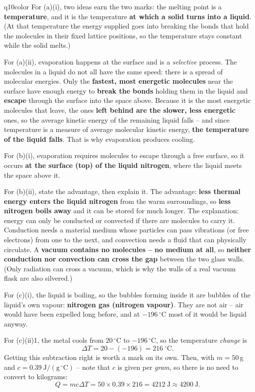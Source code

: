 \documentclass[11pt,a4paper]{article}
\begin{document}
\begin{ansbox}{q10color}
For (a)(i), two ideas earn the two marks: the melting point is a \textbf{temperature}, and it is the temperature \textbf{at which a solid turns into a liquid}. (At that temperature the energy supplied goes into breaking the bonds that hold the molecules in their fixed lattice positions, so the temperature stays constant while the solid melts.)

For (a)(ii), evaporation happens at the surface and is a \emph{selective} process. The molecules in a liquid do not all have the same speed: there is a spread of molecular energies. Only the \textbf{fastest, most energetic molecules} near the surface have enough energy to \textbf{break the bonds} holding them in the liquid and \textbf{escape} through the surface into the space above. Because it is the most energetic molecules that leave, the ones \textbf{left behind are the slower, less energetic} ones, so the average kinetic energy of the remaining liquid falls -- and since temperature is a measure of average molecular kinetic energy, \textbf{the temperature of the liquid falls}. That is why evaporation produces cooling.

For (b)(i), evaporation requires molecules to escape through a free surface, so it occurs \textbf{at the surface (top) of the liquid nitrogen}, where the liquid meets the space above it.

For (b)(ii), state the advantage, then explain it. The advantage: \textbf{less thermal energy enters the liquid nitrogen} from the warm surroundings, so \textbf{less nitrogen boils away} and it can be stored for much longer. The explanation: energy can only be conducted or convected if there are molecules to carry it. Conduction needs a material medium whose particles can pass vibrations (or free electrons) from one to the next, and convection needs a fluid that can physically circulate. A \textbf{vacuum contains no molecules -- no medium at all}, so \textbf{neither conduction nor convection can cross the gap} between the two glass walls. (Only radiation can cross a vacuum, which is why the walls of a real vacuum flask are also silvered.)

For (c)(i), the liquid is boiling, so the bubbles forming inside it are bubbles of the liquid's own vapour: \textbf{nitrogen gas (nitrogen vapour)}. They are not air -- air would have been expelled long before, and at $-196\,^{\circ}$C most of it would be liquid anyway.

For (c)(ii)1, the metal cools from $20\,^{\circ}$C to $-196\,^{\circ}$C, so the temperature \emph{change} is
\[ \Delta T = 20 - (-196) = 216\ ^{\circ}\mathrm{C}. \]
Getting this subtraction right is worth a mark on its own. Then, with $m = 50$\,g and $c = 0.39\ \mathrm{J/(g\,^{\circ}C)}$ -- note that $c$ is given per \emph{gram}, so there is no need to convert to kilograms:
\[ Q = mc\Delta T = 50 \times 0.39 \times 216 = 4212\ \mathrm{J} \approx 4200\ \mathrm{J}. \]


\end{ansbox}
\end{document}
